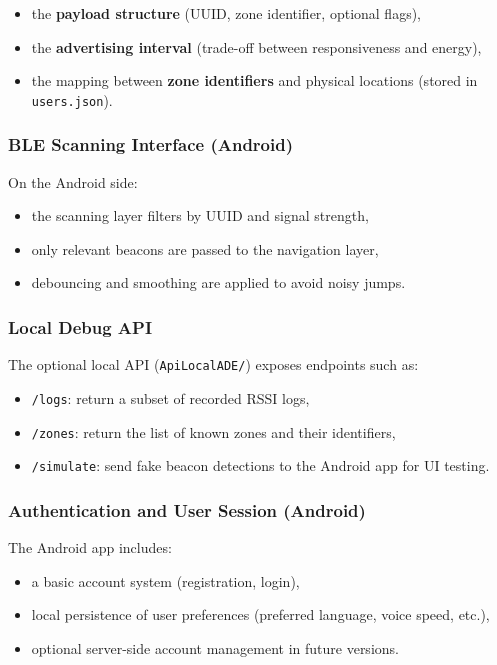 \documentclass[12pt,a4paper]{article}
\begin{document}
\begin{itemize}
    \item the \textbf{payload structure} (UUID, zone identifier, optional flags),
    \item the \textbf{advertising interval} (trade-off between responsiveness and energy),
    \item the mapping between \textbf{zone identifiers} and physical locations (stored in \texttt{users.json}).
\end{itemize}

\subsubsection{BLE Scanning Interface (Android)}

On the Android side:

\begin{itemize}
    \item the scanning layer filters by UUID and signal strength,
    \item only relevant beacons are passed to the navigation layer,
    \item debouncing and smoothing are applied to avoid noisy jumps.
\end{itemize}

\subsubsection{Local Debug API}

The optional local API (\texttt{ApiLocalADE/}) exposes endpoints such as:

\begin{itemize}
    \item \texttt{/logs}: return a subset of recorded RSSI logs,
    \item \texttt{/zones}: return the list of known zones and their identifiers,
    \item \texttt{/simulate}: send fake beacon detections to the Android app for UI testing.
\end{itemize}

\subsubsection{Authentication and User Session (Android)}

The Android app includes:

\begin{itemize}
    \item a basic account system (registration, login),
    \item local persistence of user preferences (preferred language, voice speed, etc.),
    \item optional server-side account management in future versions.
\end{itemize}
\end{document}
